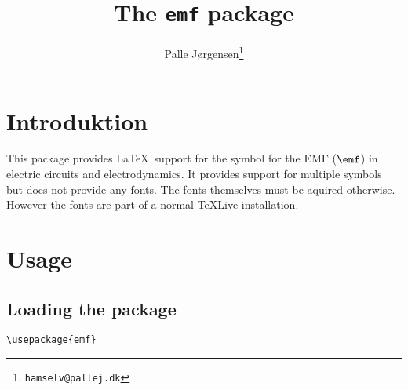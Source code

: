 \documentclass[11pt,a4paper,british]{scrartcl}
\title{The \texttt{emf} package}
\author{Palle Jørgensen\thanks{\texttt{hamselv@pallej.dk}}}
\begin{document}
\maketitle

\section{Introduktion}
\label{sec:introduktion}

This package provides \LaTeX\ support for the symbol for the EMF
($\emf$) in electric circuits and electrodynamics. It provides support
for multiple symbols but does not provide any fonts. The fonts
themselves must be aquired otherwise. However the fonts are part of a
normal \TeX Live installation.

\section{Usage}
\label{sec:usage}

\subsection{Loading the package}
\label{sec:loading-package}
\begin{lstlisting}
\usepackage{emf}
\end{lstlisting}
\end{document}
